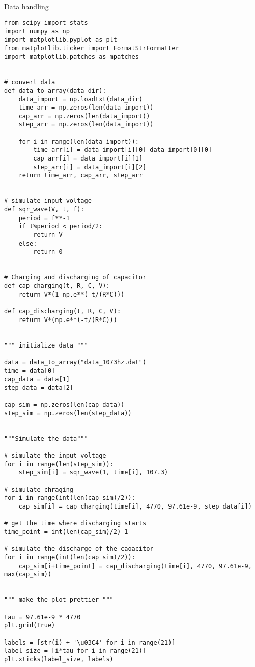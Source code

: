 \lstset{language=Python}
\lstset{frame=lines}
\lstset{numbers = left}
\lstlistingname{ Data handling}
\begin{lstlisting}[breaklines]
from scipy import stats
import numpy as np
import matplotlib.pyplot as plt
from matplotlib.ticker import FormatStrFormatter
import matplotlib.patches as mpatches


# convert data
def data_to_array(data_dir): 
    data_import = np.loadtxt(data_dir)
    time_arr = np.zeros(len(data_import))
    cap_arr = np.zeros(len(data_import))
    step_arr = np.zeros(len(data_import))

    for i in range(len(data_import)):
        time_arr[i] = data_import[i][0]-data_import[0][0]
        cap_arr[i] = data_import[i][1]
        step_arr[i] = data_import[i][2]
    return time_arr, cap_arr, step_arr


# simulate input voltage
def sqr_wave(V, t, f): 
    period = f**-1
    if t%period < period/2:
        return V
    else:
        return 0


# Charging and discharging of capacitor
def cap_charging(t, R, C, V): 
    return V*(1-np.e**(-t/(R*C)))

def cap_discharging(t, R, C, V):
    return V*(np.e**(-t/(R*C))) 


""" initialize data """
    
data = data_to_array("data_1073hz.dat")
time = data[0]
cap_data = data[1]
step_data = data[2]

cap_sim = np.zeros(len(cap_data))
step_sim = np.zeros(len(step_data))


"""Simulate the data"""

# simulate the input voltage
for i in range(len(step_sim)):
    step_sim[i] = sqr_wave(1, time[i], 107.3)

# simulate chraging
for i in range(int(len(cap_sim)/2)):
    cap_sim[i] = cap_charging(time[i], 4770, 97.61e-9, step_data[i])

# get the time where discharging starts
time_point = int(len(cap_sim)/2)-1

# simulate the discharge of the caoacitor
for i in range(int(len(cap_sim)/2)):
    cap_sim[i+time_point] = cap_discharging(time[i], 4770, 97.61e-9, max(cap_sim))
    

""" make the plot prettier """

tau = 97.61e-9 * 4770
plt.grid(True)                     

labels = [str(i) + '\u03C4' for i in range(21)]                     
label_size = [i*tau for i in range(21)]                             
plt.xticks(label_size, labels)                                      


\end{lstlisting}

